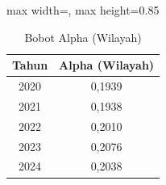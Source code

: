 \begin{table}[H]
\centering
\caption{Bobot Alpha (Wilayah)} \label{tab:appalpha_w}
\begin{adjustbox}{max width=\textwidth, max height=0.85\textheight}
\begin{tabular}{|c|c|}
\hline
\textbf{Tahun} & \textbf{Alpha (Wilayah)} \\
\hline
2020 & 0,1939 \\
2021 & 0,1938 \\
2022 & 0,2010 \\
2023 & 0,2076 \\
2024 & 0,2038 \\
\hline
\end{tabular}
\end{adjustbox}
\end{table}